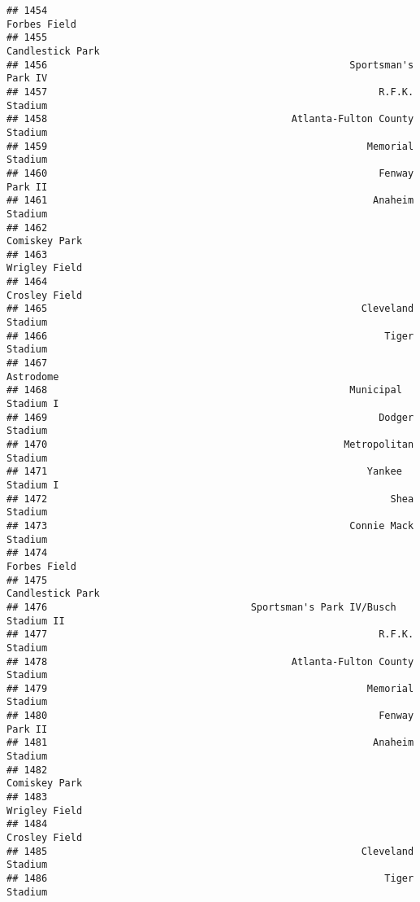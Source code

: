 \documentclass[]{article}
\begin{document}
\begin{verbatim}
## 1454                                                           Forbes Field
## 1455                                                       Candlestick Park
## 1456                                                    Sportsman's Park IV
## 1457                                                         R.F.K. Stadium
## 1458                                          Atlanta-Fulton County Stadium
## 1459                                                       Memorial Stadium
## 1460                                                         Fenway Park II
## 1461                                                        Anaheim Stadium
## 1462                                                          Comiskey Park
## 1463                                                          Wrigley Field
## 1464                                                          Crosley Field
## 1465                                                      Cleveland Stadium
## 1466                                                          Tiger Stadium
## 1467                                                              Astrodome
## 1468                                                    Municipal Stadium I
## 1469                                                         Dodger Stadium
## 1470                                                   Metropolitan Stadium
## 1471                                                       Yankee Stadium I
## 1472                                                           Shea Stadium
## 1473                                                    Connie Mack Stadium
## 1474                                                           Forbes Field
## 1475                                                       Candlestick Park
## 1476                                   Sportsman's Park IV/Busch Stadium II
## 1477                                                         R.F.K. Stadium
## 1478                                          Atlanta-Fulton County Stadium
## 1479                                                       Memorial Stadium
## 1480                                                         Fenway Park II
## 1481                                                        Anaheim Stadium
## 1482                                                          Comiskey Park
## 1483                                                          Wrigley Field
## 1484                                                          Crosley Field
## 1485                                                      Cleveland Stadium
## 1486                                                          Tiger Stadium

\end{verbatim}
\end{document}
